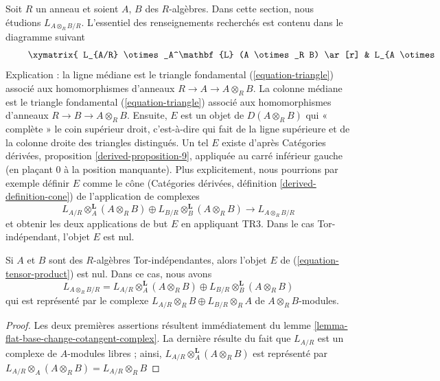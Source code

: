 \noindent
Soit $R$ un anneau et soient $A$, $B$ des $R$-algèbres. Dans cette section,
nous étudions $L_{A \otimes_R B/R}$. L'essentiel des renseignements recherchés
est contenu dans le diagramme suivant
\begin{equation}
\label{equation-tensor-product}
\vcenter{
\xymatrix{
L_{A/R} \otimes_A^\mathbf{L} (A \otimes_R B) \ar[r] &
L_{A \otimes_R B/B} \ar[r] &
E \\
L_{A/R} \otimes_A^\mathbf{L} (A \otimes_R B) \ar[r] \ar@{=}[u] &
L_{A \otimes_R B/R} \ar[r] \ar[u] &
L_{A \otimes_R B/A} \ar[u] \\
 &
L_{B/R} \otimes_B^\mathbf{L} (A \otimes_R B) \ar[u] \ar@{=}[r] &
L_{B/R} \otimes_B^\mathbf{L} (A \otimes_R B) \ar[u]
}
}
\end{equation}
Explication : la ligne médiane est le triangle fondamental
(\ref{equation-triangle}) associé aux homomorphismes d'anneaux
$R \to A \to A \otimes_R B$. La colonne médiane est le triangle fondamental
(\ref{equation-triangle}) associé aux homomorphismes d'anneaux
$R \to B \to A \otimes_R B$. Ensuite, $E$ est un objet de
$D(A \otimes_R B)$ qui « complète » le coin supérieur droit, c'est-à-dire qui
fait de la ligne supérieure et de la colonne droite des triangles distingués.
Un tel $E$ existe d'après Catégories dérivées, proposition
\ref{derived-proposition-9}, appliquée au carré inférieur gauche (en plaçant
$0$ à la position manquante). Plus explicitement, nous pourrions par exemple
définir $E$ comme le cône (Catégories dérivées, définition
\ref{derived-definition-cone}) de l'application de complexes
$$
L_{A/R} \otimes_A^\mathbf{L} (A \otimes_R B) \oplus
L_{B/R} \otimes_B^\mathbf{L} (A \otimes_R B)
\longrightarrow
L_{A \otimes_R B/R}
$$
et obtenir les deux applications de but $E$ en appliquant TR3. Dans le cas
Tor-indépendant, l'objet $E$ est nul.

\begin{lemma}
\label{lemma-tensor-product-tor-independent}
Si $A$ et $B$ sont des $R$-algèbres Tor-indépendantes, alors l'objet $E$ de
(\ref{equation-tensor-product}) est nul. Dans ce cas, nous avons
$$
L_{A \otimes_R B/R} =
L_{A/R} \otimes_A^\mathbf{L} (A \otimes_R B) \oplus
L_{B/R} \otimes_B^\mathbf{L} (A \otimes_R B)
$$
qui est représenté par le complexe
$L_{A/R} \otimes_R B \oplus L_{B/R} \otimes_R A $
de $A \otimes_R B$-modules.
\end{lemma}

\begin{proof}
Les deux premières assertions résultent immédiatement du lemme
\ref{lemma-flat-base-change-cotangent-complex}. La dernière résulte du fait que
$L_{A/R}$ est un complexe de $A$-modules libres ; ainsi,
$L_{A/R} \otimes_A^\mathbf{L} (A \otimes_R B)$ est représenté par
$L_{A/R} \otimes_A (A \otimes_R B) = L_{A/R} \otimes_R B$
\end{proof}

